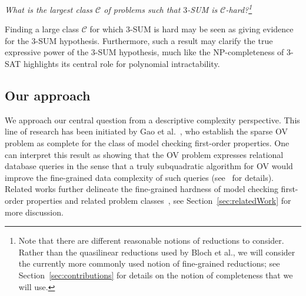\begin{center}
\em What is the largest class $\mathcal{C}$ of problems such that $3$-SUM is $\mathcal{C}$-hard?\footnote{Note that there are different reasonable notions of reductions to consider. Rather than the quasilinear reductions used by Bloch et al., we will consider the currently more commonly used notion of fine-grained reductions; see Section~\ref{sec:contributions} for details on the notion of completeness that we will use.}
\end{center}

Finding a large class $\mathcal{C}$ for which $3$-SUM is hard may be seen as giving evidence for the $3$-SUM hypothesis. Furthermore, such a result may clarify the true expressive power of the $3$-SUM hypothesis, much like the NP-completeness of 3-SAT highlights its central role for polynomial intractability.

\subsection{Our approach}
We approach our central question from a descriptive complexity perspective. This line of research
has been initiated by Gao et al.~\cite{GaoIKW19}, who establish the sparse OV problem as complete for the class of model checking first-order properties.
One can interpret this result as showing that the OV problem expresses relational database queries in the sense that a truly subquadratic algorithm for OV would improve the fine-grained data 
complexity of such queries (see~\cite{GaoIKW19} for details). Related works further delineate the fine-grained hardness of model checking first-order properties and related 
problem classes~\cite{DBLP:conf/csl/Williams14, DBLP:conf/coco/BringmannFK19, DBLP:conf/approx/BringmannCFK21, DBLP:journals/algorithmica/AnGIJKN22, DBLP:conf/icalp/BringmannCFK22,FischerKR24}, see Section~\ref{sec:relatedWork} for more discussion. %

